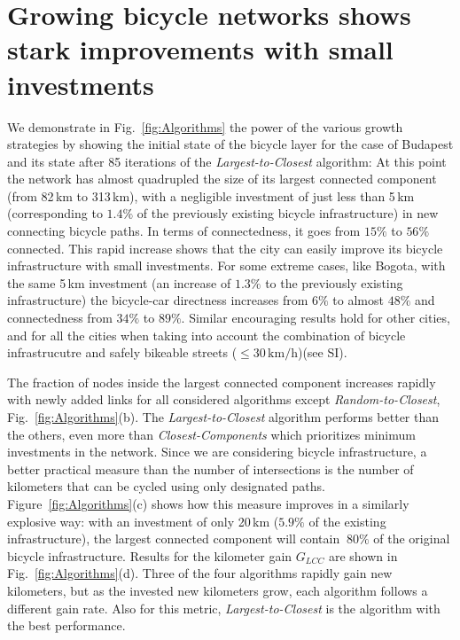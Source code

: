 \section{Growing bicycle networks shows stark improvements with small investments}
We demonstrate in Fig.~\ref{fig:Algorithms} the power of the various growth strategies by showing the initial state of the bicycle layer for the case of Budapest and its state after 85 iterations of the \emph{Largest-to-Closest} algorithm: At this point the network has almost quadrupled the size of its largest connected component (from 82\,km to 313\,km), with a negligible investment of just less than 5\,km (corresponding to $1.4\%$ of the previously existing bicycle infrastructure) in new connecting bicycle paths. In terms of connectedness, it goes from $15\%$ to $56\%$ connected. This rapid increase shows that the city can easily improve its bicycle infrastructure with small investments. For some extreme cases, like Bogota, with the same 5\,km investment (an increase of $1.3\%$ to the previously existing infrastructure) the bicycle-car directness increases from $6\%$ to almost $48\%$ and connectedness from $34\%$ to $89\%$. Similar encouraging results hold for other cities, and for all the cities when taking into account the combination of bicycle infrastrucutre and safely bikeable streets ($\leq 30\,\mathrm{km/h}$)(see SI).

The fraction of nodes inside the largest connected component increases rapidly with newly added links for all considered algorithms except \emph{Random-to-Closest}, Fig.~\ref{fig:Algorithms}(b). The \emph{Largest-to-Closest} algorithm performs better than the others, even more than \emph{Closest-Components} which prioritizes minimum investments in the network. Since we are considering bicycle infrastructure, a better practical measure than the number of intersections is the number of kilometers that can be cycled using only designated paths. Figure~\ref{fig:Algorithms}(c) shows how this measure improves in a similarly explosive way: with an investment of only 20\,km ($5.9\%$ of the existing infrastructure), the largest connected component will contain $~80\%$ of the original bicycle infrastructure. Results for the kilometer gain $G_{LCC}$ are shown in Fig.~\ref{fig:Algorithms}(d). Three of the four algorithms rapidly gain new kilometers, but as the invested new kilometers grow, each algorithm follows a different gain rate. Also for this metric, \textit{Largest-to-Closest} is the algorithm with the best performance.

